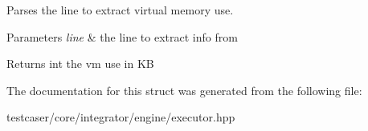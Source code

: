 Parses the line to extract virtual memory use. 


\begin{DoxyParams}{Parameters}
{\em line} & the line to extract info from \\
\hline
\end{DoxyParams}
\begin{DoxyReturn}{Returns}
int the vm use in KB 
\end{DoxyReturn}


The documentation for this struct was generated from the following file\+:\begin{DoxyCompactItemize}
\item 
testcaser/core/integrator/engine/executor.\+hpp\end{DoxyCompactItemize}
